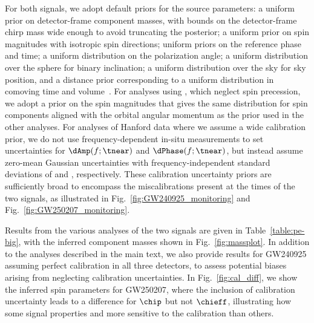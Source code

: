 For both signals, we adopt default priors for the source parameters: a uniform prior on detector-frame component masses, with bounds on the detector-frame chirp mass wide enough to avoid truncating the posterior; a uniform prior on spin magnitudes with isotropic spin directions; uniform priors on the reference phase and time; a uniform distribution on the polarization angle; a uniform distribution over the sphere for binary inclination; a uniform distribution over the sky for sky position, and a distance prior corresponding to a uniform distribution in comoving time and volume~\cite{LIGOScientific:2025yae,Romero-Shaw:2020owr,Abbott:2020niy}.
For analyses using \IMRPhenomXAS{}, which neglect spin precession, we adopt a prior on the spin magnitudes that gives the same distribution for spin components aligned with the orbital angular momentum as the prior used in the other analyses.
For analyses of Hanford data where we assume a wide calibration prior, we do not use frequency-dependent in-situ measurements to set uncertainties for $\dAmp(f;\tnear)$ and $\dPhase(f;\tnear)$, but instead assume zero-mean Gaussian uncertainties with frequency-independent standard deviations of \PEAmpSigma{} and \PEPhaseSigma{}, respectively.
These calibration uncertainty priors are sufficiently broad to encompass the miscalibrations present at the times of the two signals, as illustrated in Fig.~\ref{fig:GW240925_monitoring} and Fig.~\ref{fig:GW250207_monitoring}.

Results from the various analyses of the two signals are given in Table~\ref{table:pe-big}, with the inferred component masses shown in Fig.~\ref{fig:massplot}.
In addition to the analyses described in the main text, we also provide results for \ac{GW240925} assuming perfect calibration in all three detectors, to assess potential biases arising from neglecting calibration uncertainties.
In Fig.~\ref{fig:cal_diff}, we show the inferred spin parameters for \ac{GW250207}, where the inclusion of calibration uncertainty leads to a difference for $\chip$ but not $\chieff$, illustrating how some signal properties and more sensitive to the calibration than others.

